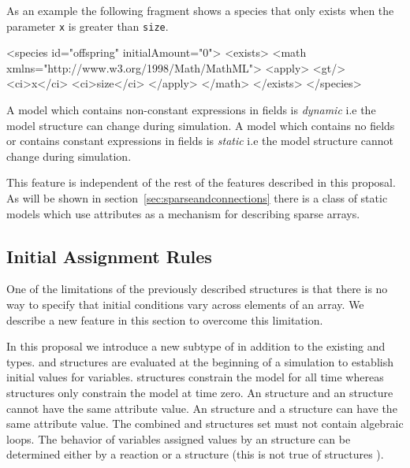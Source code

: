 \documentclass{cekarticle}
\begin{document}
As an example the following fragment shows a species that only exists when the parameter \texttt{x} is greater than \texttt{size}. 
\pagebreak
\begin{example}
<species id="offspring" initialAmount="0">
    <exists>
        <math xmlns="http://www.w3.org/1998/Math/MathML">
            <apply>
                <gt/>
                <ci>x</ci>
                <ci>size</ci>
            </apply>
        </math>
    </exists>
</species>
\end{example}

A model which contains non-constant expressions in
 fields is \emph{dynamic} i.e the model structure can change during simulation.  A model which contains no  fields or
contains constant expressions in  fields is \emph{static} i.e the model structure cannot change during simulation.

This feature is independent of the rest of the features described in this proposal.
As will be shown in section~\ref{sec:sparseandconnections} there is a class of static models which use 
attributes as a mechanism for describing sparse arrays.

\subsection{Initial Assignment Rules}

One of the limitations of the previously described structures is that there is no way to 
specify that initial conditions vary across elements of an array.  We describe a new feature
in this section to overcome this limitation.

In this proposal we introduce a new subtype of   in addition
to the existing  and  types.  
 and  structures are evaluated at the beginning of a simulation to establish
initial values for variables.   structures constrain the model for all time
whereas  structures only constrain the model at time zero. 
An  structure and an  structure cannot have the same
 attribute value.  An  structure and a  structure can have the same
 attribute value.  The combined  and  structures
set must not contain algebraic loops.  The behavior of variables assigned values by an
 structure can be determined either by a reaction  or a  structure (this is not
true of  structures ).
\end{document}
